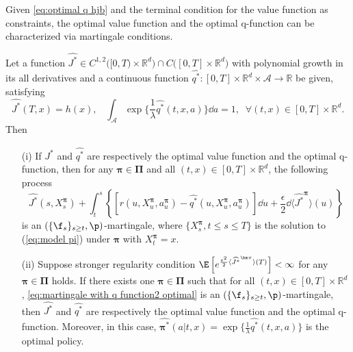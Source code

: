 Given \eqref{eq:optimal q hjb} and the terminal condition for the value function as constraints, the optimal value function and the optimal q-function can be characterized via martingale conditions. 
\begin{theorem}
	\label{thm:q optimal}
	Let a function $\widehat{J^*}\in C^{1,2}\big([0,T)\times \mathbb{R}^d \big) \cap C\big([0,T]\times \mathbb{R}^d \big)$ with polynomial growth in its all derivatives and a continuous function $\widehat{q^*}:[0,T]\times \mathbb{R}^d\times \mathcal{A}\to \mathbb{R}$ be given, satisfying
	\begin{equation}
		\label{eq:q hjb2 optimal}
		\widehat{J^*}(T,x) = h(x),\;\;\; \int_{\mathcal{A}} \exp\{ \frac{1}{\lambda} \widehat{q^*}(t,x,a) \} \dd a =1,\;\;\forall (t,x)\in[0,T]\times\mathbb{R}^d.
	\end{equation}
	Then 	\begin{enumerate}
		\item[(i)] If $\widehat{J^*}$ and $\widehat{q^*}$ are respectively the optimal value function and the optimal q-function, then for any $\bm\pi\in \bm\Pi$ and all $(t,x)\in[0,T]\times\mathbb{R}^d$, the following process
		\begin{equation}
			\label{eq:martingale with q function2 optimal}
			\widehat{J^*}(s,{X}_s^{\bm\pi}) + \int_t^s \left\{ \left[ r(u,{X}_{u}^{\bm\pi},a^{\bm\pi}_{u}) - \widehat{q^*}(u,{X}_{u}^{\bm\pi},a^{\bm\pi}_{u})  \right]\dd u + \frac{\epsilon}{2}\dd \langle \widehat{J^*}^{\bm\pi} \rangle(u)\right\}
		\end{equation}
		is an $(\{\f_s\}_{s\geq t},\p)$-martingale, where $\{{X}_s^{\bm\pi}, t\leq s\leq T\}$ is the solution to (\ref{eq:model pi}) under $\bm\pi$ with ${X}_t^{\bm\pi}=x$.
		\item[(ii)] Suppose stronger regularity condition $\E\left[ e^{\frac{\epsilon^2}{2} \langle \widehat{J^*}^{\bm \pi}\rangle(T) }  \right] < \infty$ for any $\bm \pi\in \bm\Pi$ holds. If there exists one $\bm\pi\in \bm\Pi$ such that for all $(t,x)\in[0,T]\times\mathbb{R}^d$,  \eqref{eq:martingale with q function2 optimal} is an $(\{\f_s\}_{s\geq t},\p)$-martingale, then $\widehat{J^*}$ and $\widehat{q^*}$ are respectively the optimal value function and the optimal q-function. Moreover, in this case, $\widehat{\bm\pi^*}(a|t,x) = \exp\{  \frac{1}{\lambda}\widehat{q^*}(t,x,a) \}$ is the optimal policy. 	\end{enumerate}
\end{theorem}

